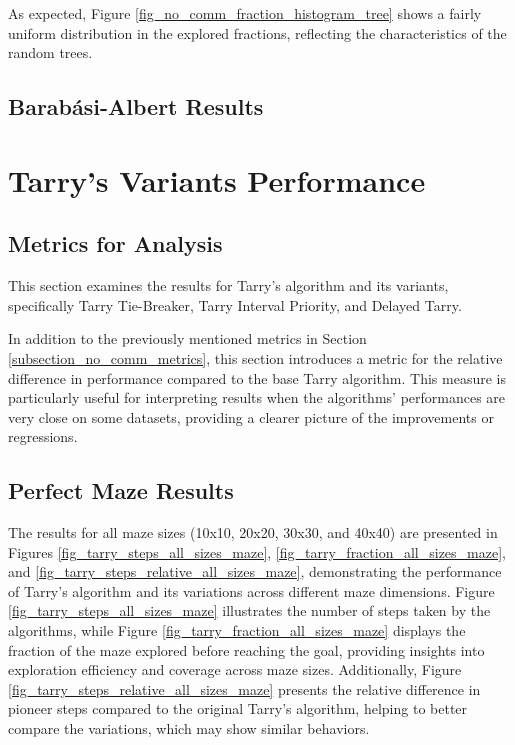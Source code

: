 As expected, Figure \ref{fig_no_comm_fraction_histogram_tree} shows a fairly uniform distribution in the explored fractions, reflecting the characteristics of the random trees.

\subsection{Barabási-Albert Results} 
\label{subsection_no_comm_barabasi_albert_results}


\section{Tarry's Variants Performance}
\label{section_result_tarry}

\subsection{Metrics for Analysis}
\label{subsection_tarry_metrics}

This section examines the results for Tarry's algorithm and its variants, specifically Tarry Tie-Breaker, Tarry Interval Priority, and Delayed Tarry.

In addition to the previously mentioned metrics in Section \ref{subsection_no_comm_metrics}, this section introduces a metric for the relative difference in performance compared to the base Tarry algorithm. This measure is particularly useful for interpreting results when the algorithms' performances are very close on some datasets, providing a clearer picture of the improvements or regressions.

\subsection{Perfect Maze Results} 
\label{subsection_tarry_maze_results}

The results for all maze sizes (10x10, 20x20, 30x30, and 40x40) are presented in Figures \ref{fig_tarry_steps_all_sizes_maze}, \ref{fig_tarry_fraction_all_sizes_maze}, and \ref{fig_tarry_steps_relative_all_sizes_maze}, demonstrating the performance of Tarry's algorithm and its variations across different maze dimensions. Figure \ref{fig_tarry_steps_all_sizes_maze} illustrates the number of steps taken by the algorithms, while Figure \ref{fig_tarry_fraction_all_sizes_maze} displays the fraction of the maze explored before reaching the goal, providing insights into exploration efficiency and coverage across maze sizes. Additionally, Figure \ref{fig_tarry_steps_relative_all_sizes_maze} presents the relative difference in pioneer steps compared to the original Tarry's algorithm, helping to better compare the variations, which may show similar behaviors.

